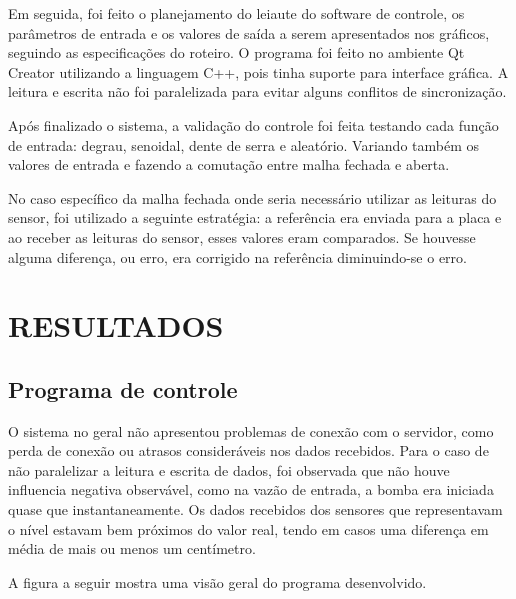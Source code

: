 \documentclass[a4paper,12pt]{article}
\begin{document}
Em seguida, foi feito o planejamento do leiaute do software de controle, os parâmetros de entrada e os valores de saída a serem apresentados nos gráficos, seguindo as especificações do roteiro. O programa foi feito no ambiente Qt Creator utilizando a linguagem C++, pois tinha suporte para interface gráfica. A leitura e escrita não foi paralelizada para evitar alguns conflitos de sincronização. 

Após finalizado o sistema, a validação do controle foi feita testando cada função de entrada: degrau, senoidal, dente de serra e aleatório. Variando também os valores de entrada e fazendo a comutação entre malha fechada e aberta. 

No caso específico da malha fechada onde seria necessário utilizar as leituras do sensor, foi utilizado a seguinte estratégia: a referência era enviada para a placa e ao receber as leituras do sensor, esses valores eram comparados. Se houvesse alguma diferença, ou erro, era corrigido na referência diminuindo-se o erro.


\newpage


\thispagestyle{main}

\section{RESULTADOS}

\hspace{4ex}

\subsection{Programa de controle}
O sistema no geral não apresentou problemas de conexão com o servidor, como perda de conexão ou atrasos consideráveis nos dados recebidos. Para o caso de não paralelizar a leitura e escrita de dados, foi observada que não houve influencia negativa observável, como na vazão de entrada, a bomba era iniciada quase que instantaneamente. Os dados recebidos dos sensores que representavam o nível estavam bem próximos do valor real, tendo em casos uma diferença em média de mais ou menos um centímetro. 

A figura a seguir mostra uma visão geral do programa desenvolvido.
\end{document}

